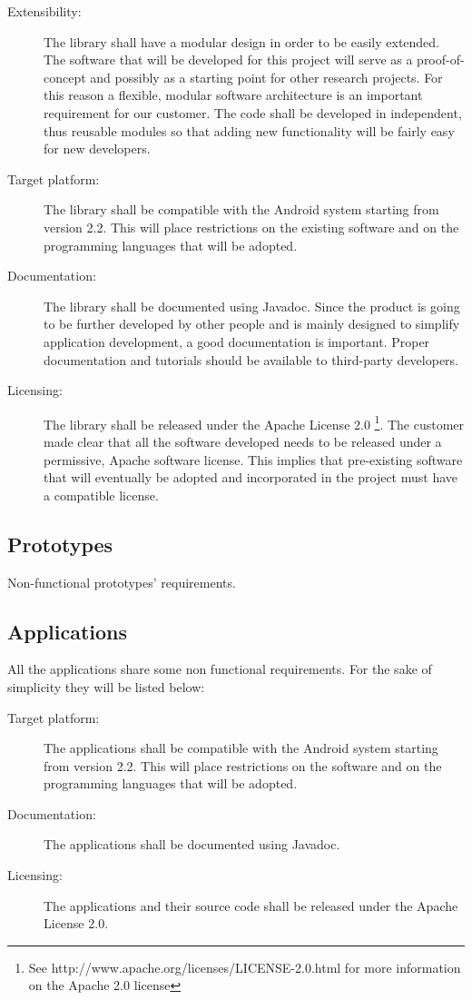 \begin{description}
	\item[Extensibility:] The library shall have a modular design
	in order to be easily extended. The software that will be developed for
	this project will serve as a proof-of-concept and possibly as a starting
	point for other research projects. For this reason a flexible, modular
	software architecture is an important requirement for our customer. The code
	shall be developed in independent, thus reusable modules so that adding new
	functionality will be fairly easy for new developers.
	\item[Target platform:] The library shall be compatible with the Android
	system starting from version 2.2. This will place restrictions on the
	existing software and on the programming languages that will be adopted.
	\item[Documentation:] The library shall be documented using Javadoc.
	Since the product is going to be further developed by other people and is
	mainly designed to simplify application development, a good documentation is
	important. Proper documentation and tutorials should be available to
	third-party developers.
	\item[Licensing:] The library shall be released under the Apache License 2.0
	\footnote{See http://www.apache.org/licenses/LICENSE-2.0.html for more
	information on the Apache 2.0 license}. The customer made clear that all the
	software developed needs to be released under a permissive, Apache software
	license. This implies that pre-existing software that will eventually be
	adopted and incorporated in the project must have a compatible license.
\end{description}


\subsection{Prototypes}

Non-functional prototypes' requirements.

\subsection{Applications}

All the applications share some non functional requirements.
For the sake of simplicity they will be listed below:

\begin{description}
	\item[Target platform:] The applications shall be compatible with the
	Android system starting from version 2.2. This will place restrictions on
	the software and on the programming languages that will be adopted.
	\item[Documentation:] The applications shall be documented using Javadoc.
	\item[Licensing:] The applications and their source code shall be released under the Apache
	License 2.0.
\end{description}
